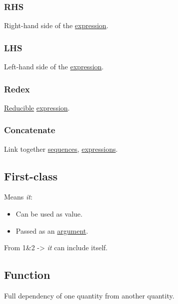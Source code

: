 \documentclass[11pt]{article}
\begin{document}
\subsubsection{\label{orgb8773a8}RHS}
\label{sec:org54dd81e}
Right-hand side of the \hyperref[org667db83]{expression}.\\

\subsubsection{\label{orgcb65c13}LHS}
\label{sec:org98a0087}
Left-hand side of the \hyperref[org667db83]{expression}.\\

\subsubsection{\label{orga0eba26}Redex}
\label{sec:org2f9faa7}
\hyperref[org3d6481e]{Reducible} \hyperref[org667db83]{expression}.\\

\subsubsection{\label{org90099c8}Concatenate}
\label{sec:orge1ff404}
Link together \hyperref[orgf15dce2]{sequences}, \hyperref[org9eb2c72]{expressions}.\\

\subsection{\label{org6b0d252}First-class}
\label{sec:orga5953de}
Means \emph{it}:\\
\begin{itemize}
\item Can be used as value.\\
\item Passed as an \hyperref[orgf66a5f7]{argument}.\\
\end{itemize}
From 1\&2 -> \emph{it} can include itself.\\

\subsection{\label{orgeb5cddb}Function}
\label{sec:orgae2e51f}
Full dependency of one quantity from another quantity.\\
\end{document}
